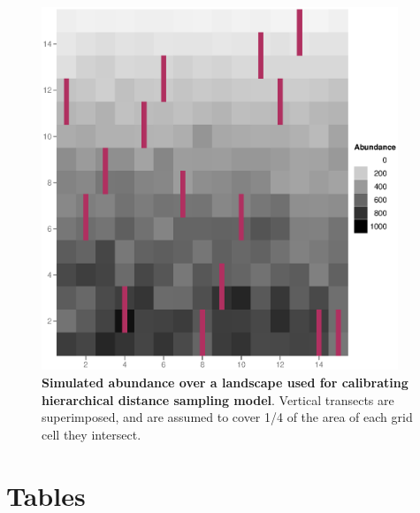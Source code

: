 \documentclass[10pt]{article}
\begin{document}
\begin{figure}
\begin{center}
\includegraphics[width=0.95\textwidth]{sim_habitat_true.eps}
\end{center}
\caption{{\bf Simulated abundance over a landscape used for calibrating hierarchical distance sampling model}.  Vertical transects are superimposed, and are assumed to cover 1/4 of the area of each grid cell they intersect.}
\label{fig:sim_landscape}
\end{figure}
\clearpage

\section*{Tables}
\end{document}
